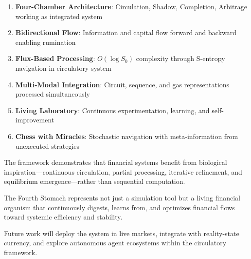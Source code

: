 \documentclass[12pt]{article}
\begin{document}
\begin{enumerate}
    \item \textbf{Four-Chamber Architecture}: Circulation, Shadow, Completion, Arbitrage working as integrated system
    \item \textbf{Bidirectional Flow}: Information and capital flow forward and backward enabling rumination
    \item \textbf{Flux-Based Processing}: $O(\log S_0)$ complexity through S-entropy navigation in circulatory system
    \item \textbf{Multi-Modal Integration}: Circuit, sequence, and gas representations processed simultaneously
    \item \textbf{Living Laboratory}: Continuous experimentation, learning, and self-improvement
    \item \textbf{Chess with Miracles}: Stochastic navigation with meta-information from unexecuted strategies
\end{enumerate}

The framework demonstrates that financial systems benefit from biological inspiration—continuous circulation, partial processing, iterative refinement, and equilibrium emergence—rather than sequential computation.

The Fourth Stomach represents not just a simulation tool but a living financial organism that continuously digests, learns from, and optimizes financial flows toward systemic efficiency and stability.

Future work will deploy the system in live markets, integrate with reality-state currency, and explore autonomous agent ecosystems within the circulatory framework.
\end{document}
